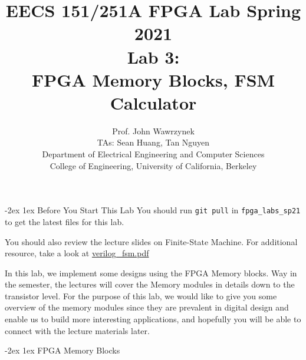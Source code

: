 \documentclass[11pt]{article}
\makeatletter
\renewcommand{\section}
{\@startsection {section}{1}{0pt}
 {-2ex}
 {1ex}
 {\bfseries\Large}}
\makeatother
\begin{document}
\def\PYZsq{\textquotesingle}
\title{\vspace{-0.4in}\Large \bf EECS 151/251A FPGA Lab Spring 2021\\
Lab 3:\\FPGA Memory Blocks, FSM Calculator\vspace{-0.1in}}

\author{Prof. John Wawrzynek \\
TAs: Sean Huang, Tan Nguyen \\ Department of Electrical Engineering and Computer Sciences\\
College of Engineering, University of California, Berkeley}
\date{}
\maketitle

\section{Before You Start This Lab}\label{sec:begin}
You should run \verb|git pull| in \verb|fpga_labs_sp21| to get the latest files for this lab.

You should also review the lecture slides on Finite-State Machine. For additional resource, take a look at \href{http://inst.eecs.berkeley.edu/~eecs151/sp21/files/verilog/verilog\_fsm.pdf}{verilog\_fsm.pdf}


In this lab, we implement some designs using the FPGA Memory blocks. Way in the semester, the lectures will cover the Memory modules in details down to the transistor level. For the purpose of this lab, we would like to give you some overview of the memory modules since they are prevalent in digital design and enable us to build more interesting applications, and hopefully you will be able to connect with the lecture materials later.

\section{FPGA Memory Blocks}
\end{document}
